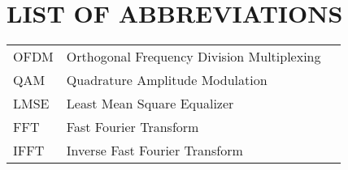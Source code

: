 \section*{LIST OF ABBREVIATIONS}
 {}

\begin{tabularx}{\textwidth}{ L{0.4} L{1.3} L{1.3} }
    OFDM & Orthogonal Frequency Division Multiplexing \\
    QAM & Quadrature Amplitude Modulation \\
    LMSE & Least Mean Square Equalizer \\ %
    FFT & Fast Fourier Transform \\
    IFFT & Inverse Fast Fourier Transform \\
\end{tabularx}

\newpage